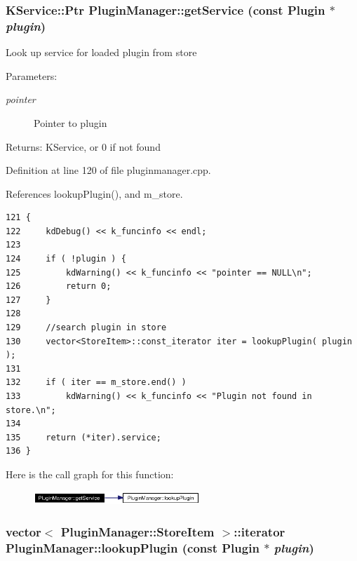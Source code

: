 \subsubsection{\setlength{\rightskip}{0pt plus 5cm}KService::Ptr Plugin\-Manager::get\-Service (const {\bf Plugin} $\ast$ {\em plugin})\hspace{0.3cm}{\tt  [static]}}\label{classPluginManager_PluginManagere4}


Look up service for loaded plugin from store \begin{Desc}
\item[Parameters:]
\begin{description}
\item[{\em pointer}]Pointer to plugin \end{description}
\end{Desc}
\begin{Desc}
\item[Returns:]KService, or 0 if not found \end{Desc}


Definition at line 120 of file pluginmanager.cpp.

References lookup\-Plugin(), and m\_\-store.



\footnotesize\begin{verbatim}121 {
122     kdDebug() << k_funcinfo << endl;
123     
124     if ( !plugin ) {
125         kdWarning() << k_funcinfo << "pointer == NULL\n";   
126         return 0;
127     }
128        
129     //search plugin in store
130     vector<StoreItem>::const_iterator iter = lookupPlugin( plugin ); 
131     
132     if ( iter == m_store.end() ) 
133         kdWarning() << k_funcinfo << "Plugin not found in store.\n";
134     
135     return (*iter).service;
136 }
\end{verbatim}\normalsize 


Here is the call graph for this function:\begin{figure}[H]
\begin{center}
\leavevmode
\includegraphics[width=178pt]{classPluginManager_PluginManagere4_cgraph}
\end{center}
\end{figure}
\subsubsection{\setlength{\rightskip}{0pt plus 5cm}vector$<$ {\bf Plugin\-Manager::Store\-Item} $>$::iterator Plugin\-Manager::lookup\-Plugin (const {\bf Plugin} $\ast$ {\em plugin})\hspace{0.3cm}{\tt  [static, private]}}\label{classPluginManager_PluginManagerh0}




